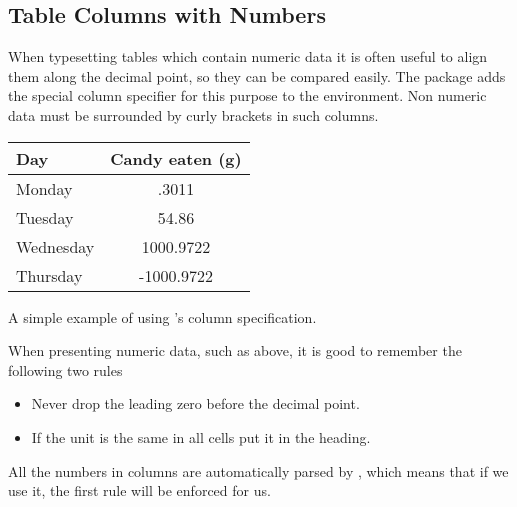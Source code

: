 \subsection{Table Columns with Numbers}\label{sec:sitables}

When typesetting tables which contain numeric data it is often useful to align
them along the decimal point, so they can be compared easily. The 
package adds the special column specifier  for this purpose to the
 environment. Non numeric data must be surrounded by curly brackets
in such columns.
\begin{listing}
  \begin{example}[examplewidth=0.7\linewidth, vertical_mode]
\begin{tabular}{@{}lS@{}}
  \toprule
  Day       & {Candy eaten (\unit{\g})} \\
  \midrule
  Monday    & .3011                     \\
  Tuesday   & 54.86                     \\
  Wednesday & 1000.9722                 \\
  Thursday  & -1000.9722                \\
  \bottomrule
\end{tabular}
\end{example}
  \caption{A simple example of using 's  column
    specification.}
\end{listing}

When presenting numeric data, such as above, it is good to remember the
following two rules
\begin{itemize}
  \item Never drop the leading zero before the decimal point.
  \item If the unit is the same in all cells put it in the heading.
\end{itemize}
All the numbers in  columns are automatically parsed by ,
which means that if we use it, the first rule will be enforced for us.

